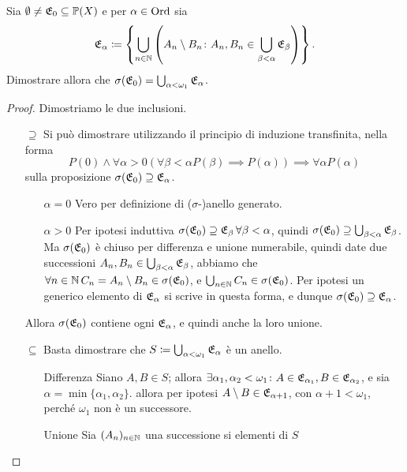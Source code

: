 \documentclass[../EserciziIstituzioniAnalisi.tex]{subfiles}
\begin{document}
\begin{exercise}  
  Sia $\emptyset \neq \mathfrak E_0 \subseteq \mathbb P(X)$ e per $\alpha \in \operatorname{Ord}$ sia 
\begin{equation}
  \mathfrak E_{\alpha}\coloneqq \left\{ \bigcup_{n\in \mathbb N} \left(A_n\setminus B_n \colon A_n,B_n \in \bigcup_{\beta<\alpha}\mathfrak E_{\beta}\right)\right\}.
\end{equation}
Dimostrare allora che $\sigma(\mathfrak E_0)=\bigcup_{\alpha<\omega_1}\mathfrak E_{\alpha}$.
\end{exercise}
\begin{proof}
  Dimostriamo le due inclusioni.
  \begin{itemize}
    \item[$\supseteq$] Si può dimostrare utilizzando il principio di induzione transfinita, nella forma
    $$P(0)\land \forall \alpha>0 \left(\forall \beta<\alpha P(\beta) \implies P(\alpha) \right) \implies \forall \alpha P(\alpha)$$
    sulla proposizione $\sigma(\mathfrak E_0)\supseteq\mathfrak E_{\alpha}$.
    \begin{itemize}
      \item[$\alpha=0$] Vero per definizione di ($\sigma$-)anello generato.
      \item[$\alpha>0$] Per ipotesi induttiva $\sigma(\mathfrak E_0)\supseteq\mathfrak E_{\beta}\, \forall \beta<\alpha$, quindi $\sigma(\mathfrak E_0)\supseteq\bigcup_{\beta<\alpha}\mathfrak E_{\beta}$. Ma $\sigma(\mathfrak E_0)$ è chiuso per differenza e unione numerabile, quindi date due successioni $A_n, B_n \in \bigcup_{\beta<\alpha}\mathfrak E_{\beta}$, abbiamo che $\forall n \in \mathbb N\, C_n=A_n\setminus B_n\in \sigma(\mathfrak E_0)$, e $\bigcup_{n\in \mathbb N}C_n \in \sigma(\mathfrak E_0)$. Per ipotesi un generico elemento di $\mathfrak E_{\alpha}$ si scrive in questa forma, e dunque $\sigma(\mathfrak E_0)\supseteq\mathfrak E_{\alpha}$.
    \end{itemize}
    Allora $\sigma(\mathfrak E_0)$ contiene ogni $\mathfrak E_{\alpha}$, e quindi anche la loro unione.
    \item[$\subseteq$] Basta dimostrare che $S\coloneqq\bigcup_{\alpha<\omega_1}\mathfrak E_{\alpha}$ è un anello.
    \begin{itemize}
      \item[Differenza] Siano $A,B\in S$; allora $\exists \alpha_1, \alpha_2<\omega_1 \colon A\in \mathfrak E_{\alpha_1}, B\in \mathfrak E_{\alpha_2}$, e sia $\alpha=\min\{\alpha_1, \alpha_2\}$. allora per ipotesi $A\setminus B\in\mathfrak E_{\alpha+1}$, con $\alpha+1<\omega_1$, perché $\omega_1$ non è un successore.      
      \item[Unione] Sia $(A_n)_{n\in\mathbb N}$ una successione si elementi di $S$ 
    \end{itemize}
  \end{itemize}
\end{proof}
\end{document}
